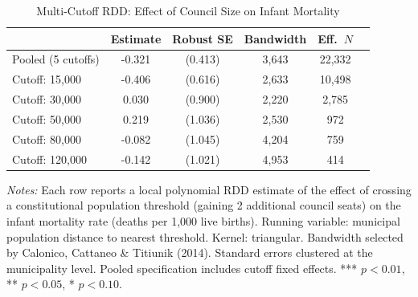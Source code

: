 \begin{table}[htbp]
\centering
\caption{Multi-Cutoff RDD: Effect of Council Size on Infant Mortality}
\label{tab:main_rdd}
\begin{tabular}{lccccc}
\toprule
 & Estimate & Robust SE & Bandwidth & Eff.\ $N$ \\
\midrule
Pooled (5 cutoffs) & -0.321 & (0.413) & 3,643 & 22,332 \\
\midrule
Cutoff: 15,000 & -0.406 & (0.616) & 2,633 & 10,498 \\
Cutoff: 30,000 & 0.030 & (0.900) & 2,220 & 2,785 \\
Cutoff: 50,000 & 0.219 & (1.036) & 2,530 & 972 \\
Cutoff: 80,000 & -0.082 & (1.045) & 4,204 & 759 \\
Cutoff: 120,000 & -0.142 & (1.021) & 4,953 & 414 \\
\bottomrule
\end{tabular}
\begin{tablenotes}[flushleft]\small
\item \textit{Notes:} Each row reports a local polynomial RDD estimate of the effect of crossing a constitutional population threshold (gaining 2 additional council seats) on the infant mortality rate (deaths per 1,000 live births). Running variable: municipal population distance to nearest threshold. Kernel: triangular. Bandwidth selected by Calonico, Cattaneo \& Titiunik (2014). Standard errors clustered at the municipality level. Pooled specification includes cutoff fixed effects. *** $p<0.01$, ** $p<0.05$, * $p<0.10$.
\end{tablenotes}
\end{table}

